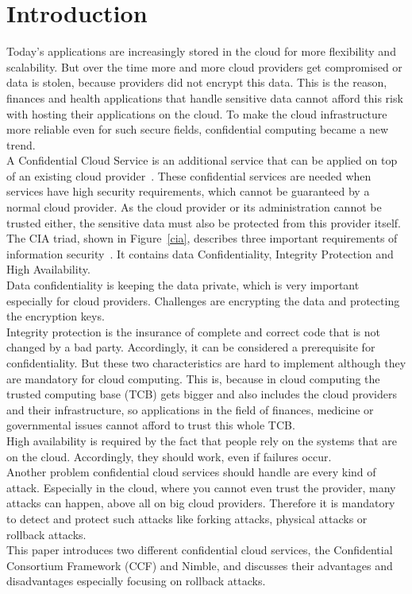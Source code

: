 \section{Introduction}
Today's applications are increasingly stored in the cloud for more flexibility and scalability. %
 But over the time more and more cloud providers get compromised or data is stolen, because providers did not encrypt this data. This is the reason, finances and health applications that handle sensitive data cannot afford this risk with hosting their applications on the cloud. To make the cloud infrastructure more reliable even for such secure fields, confidential computing became a new trend.\\
 A Confidential Cloud Service is an additional service that can be applied on top of an existing cloud provider~\cite{confidentiality}. These confidential services are needed when services have high security requirements, which cannot be guaranteed by a normal cloud provider. As the cloud provider or its administration cannot be trusted either, the sensitive data must also be protected from this provider itself. \\
 The CIA triad,  shown in Figure~\ref{cia},  describes three important requirements of information security~\cite{ciaBook, cia}. It contains data Confidentiality, Integrity Protection and High Availability.\\
 Data confidentiality is keeping the data private, which is very important especially for cloud providers. Challenges are encrypting the data and protecting the encryption keys.\\
 Integrity protection is the insurance of complete and correct code that is not changed by a bad party. Accordingly, it can be considered a prerequisite for confidentiality. But these two characteristics are hard to implement although they are mandatory for cloud computing. This is, because in cloud computing the trusted computing base (TCB) gets bigger and also includes the cloud providers and their infrastructure, so applications in the field of finances, medicine or governmental issues cannot afford to trust this whole TCB.\\
 High availability is required by the fact that people rely on the systems that are on the cloud. Accordingly, they should work, even if failures occur.\\
 Another problem confidential cloud services should handle are every kind of attack. Especially in the cloud, where you cannot even trust the provider, many attacks can happen, above all on big cloud providers. Therefore it is mandatory to detect and protect such attacks like forking attacks, physical attacks or rollback attacks.\\
 This paper introduces two different confidential cloud services, the Confidential Consortium Framework (CCF) and Nimble,  and discusses their advantages and disadvantages especially focusing on rollback attacks. 
	 